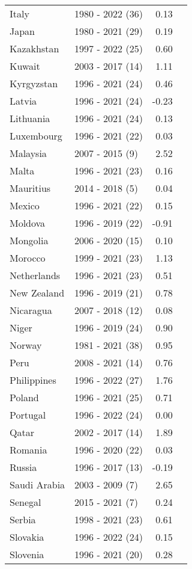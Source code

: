\begin{table}[pos=h]
{{\centering
\begin{tabular}{llrr} Italy & 1980 - 2022 (36) & 0.13\\
Japan & 1980 - 2021 (29) & 0.19\\
Kazakhstan & 1997 - 2022 (25) & 0.60\\
Kuwait & 2003 - 2017 (14) & 1.11\\
Kyrgyzstan & 1996 - 2021 (24) & 0.46\\
\addlinespace
Latvia & 1996 - 2021 (24) & -0.23\\
Lithuania & 1996 - 2021 (24) & 0.13\\
Luxembourg & 1996 - 2021 (22) & 0.03\\
Malaysia & 2007 - 2015 (9) & 2.52\\
Malta & 1996 - 2021 (23) & 0.16\\
\addlinespace
Mauritius & 2014 - 2018 (5) & 0.04\\
Mexico & 1996 - 2021 (22) & 0.15\\
Moldova & 1996 - 2019 (22) & -0.91\\
Mongolia & 2006 - 2020 (15) & 0.10\\
Morocco & 1999 - 2021 (23) & 1.13\\
\addlinespace
Netherlands & 1996 - 2021 (23) & 0.51\\
New Zealand & 1996 - 2019 (21) & 0.78\\
Nicaragua & 2007 - 2018 (12) & 0.08\\
Niger & 1996 - 2019 (24) & 0.90\\
Norway & 1981 - 2021 (38) & 0.95\\
\addlinespace
Peru & 2008 - 2021 (14) & 0.76\\
Philippines & 1996 - 2022 (27) & 1.76\\
Poland & 1996 - 2021 (25) & 0.71\\
Portugal & 1996 - 2022 (24) & 0.00\\
Qatar & 2002 - 2017 (14) & 1.89\\
\addlinespace
Romania & 1996 - 2020 (22) & 0.03\\
Russia & 1996 - 2017 (13) & -0.19\\
Saudi Arabia & 2003 - 2009 (7) & 2.65\\
Senegal & 2015 - 2021 (7) & 0.24\\
Serbia & 1998 - 2021 (23) & 0.61\\
\addlinespace
Slovakia & 1996 - 2022 (24) & 0.15\\
Slovenia & 1996 - 2021 (20) & 0.28\\

\end{tabular}}}
\end{table}
